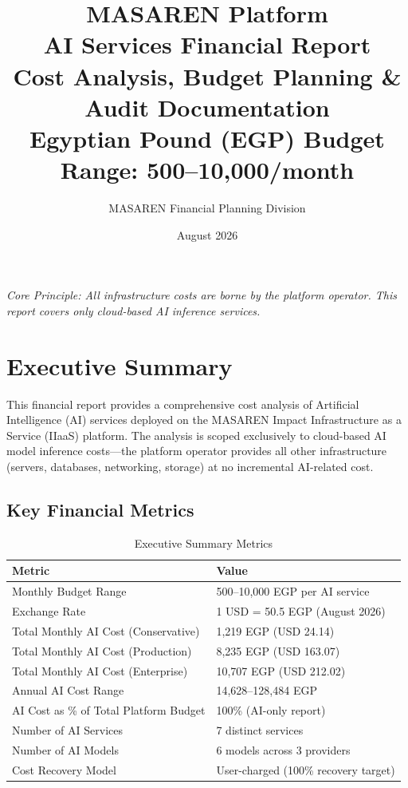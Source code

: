 \documentclass[11pt,a4paper]{article}
\title{\textbf{MASAREN Platform}\\[6pt]
\Large\textbf{AI Services Financial Report}\\[4pt]
\normalsize Cost Analysis, Budget Planning \& Audit Documentation\\[2pt]
\normalsize Egyptian Pound (EGP) Budget Range: 500--10,000/month}
\author{MASAREN Financial Planning Division}
\date{August 2026}
\begin{document}
\maketitle
\thispagestyle{empty}

\begin{center}
\textit{Core Principle: All infrastructure costs are borne by the platform operator. This report covers only cloud-based AI inference services.}
\end{center}

\vspace{1em}

\tableofcontents
\newpage

\section{Executive Summary}

This financial report provides a comprehensive cost analysis of Artificial Intelligence (AI) services deployed on the MASAREN Impact Infrastructure as a Service (IIaaS) platform. The analysis is scoped exclusively to cloud-based AI model inference costs---the platform operator provides all other infrastructure (servers, databases, networking, storage) at no incremental AI-related cost.

\subsection{Key Financial Metrics}

\begin{table}[H]
\centering
\begin{tabular}{|l|l|}
\hline
\textbf{Metric} & \textbf{Value} \\
\hline
Monthly Budget Range & 500--10,000 EGP per AI service \\
\hline
Exchange Rate & 1 USD = 50.5 EGP (August 2026) \\
\hline
Total Monthly AI Cost (Conservative) & 1,219 EGP (USD 24.14) \\
\hline
Total Monthly AI Cost (Production) & 8,235 EGP (USD 163.07) \\
\hline
Total Monthly AI Cost (Enterprise) & 10,707 EGP (USD 212.02) \\
\hline
Annual AI Cost Range & 14,628--128,484 EGP \\
\hline
AI Cost as \% of Total Platform Budget & 100\% (AI-only report) \\
\hline
Number of AI Services & 7 distinct services \\
\hline
Number of AI Models & 6 models across 3 providers \\
\hline
Cost Recovery Model & User-charged (100\% recovery target) \\
\hline
\end{tabular}
\caption{Executive Summary Metrics}
\end{table}
\end{document}

